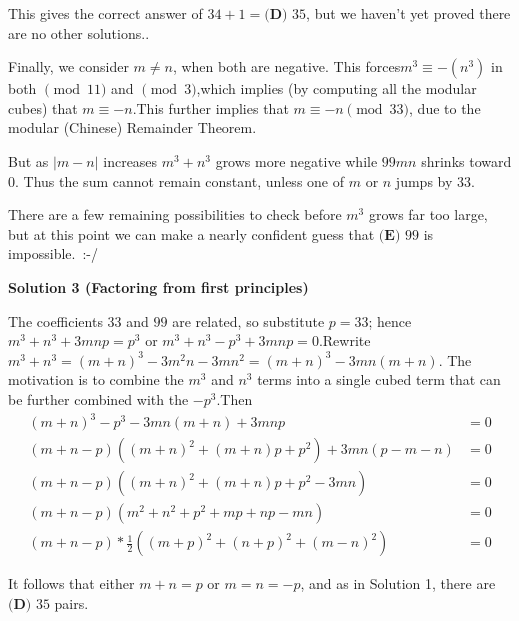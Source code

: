 \begin{enumerate}
 This gives the correct answer of $34+1=\boxed{\textbf{(D) } 35}$, but we haven't yet proved there are no other solutions..

 Finally, we consider $m \neq n$, when both are negative. This forces$m^3 \equiv -(n^3)$ in both $\pmod {11}$ and $\pmod 3$,which implies (by computing all the modular cubes) that $m \equiv -n$.This further implies that $m \equiv -n \pmod {33}$, due to the modular (Chinese) Remainder Theorem.

 But as $|m-n|$ increases $m^3+n^3$ grows more negative while $99mn$ shrinks toward 0. Thus the sum cannot remain constant, unless one of $m$ or $n$ jumps by 33.

 There are a few remaining possibilities to check before $m^3$ grows far too large, but at this point we can make a nearly confident guess that $\textbf{(E) } 99$ is impossible. :-/

 



\textbf{Solution 3 (Factoring from first principles)}

The coefficients $33$ and $99$ are related, so substitute $p = 33$; hence $m^3 + n^3 + 3mnp = p^3$ or $m^3 + n^3 - p^3 + 3mnp = 0$.Rewrite $m^3 + n^3 = (m+n)^3 - 3m^2n - 3mn^2 = (m+n)^3 - 3mn(m+n)$. The motivation is to combine the $m^3$ and $n^3$ terms into a single cubed term that can be further combined with the $-p^3$.Then \begin{align*}(m+n)^3 - p^3 - 3mn(m+n) + 3mnp &= 0 \\(m+n-p)((m+n)^2 + (m+n)p + p^2) + 3mn(p-m-n) &= 0 \\(m+n-p)((m+n)^2 + (m+n)p + p^2 - 3mn) &= 0 \\(m+n-p)(m^2 + n^2 + p^2 + mp + np - mn) &= 0 \\(m+n-p)*\frac{1}{2} ((m+p)^2 + (n+p)^2 + (m-n)^2) &= 0\end{align*}


 It follows that either $m + n = p$ or $m = n = -p$, and as in Solution 1, there are $\boxed{\textbf{(D) } 35}$ pairs.

 


\end{enumerate}